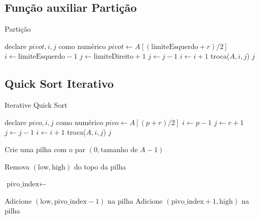 \subsection{Função auxiliar Partição}

\begin{algorithm}
	\caption{Partição}
	\label{algo:particao}
	\begin{algorithmic}[1]
		\State declare $pivot, i, j$ como numérico
		\State $pivot \gets A[(\text{limiteEsquerdo} + r) / 2]$
		\State $i \gets \text{limiteEsquerdo}- 1$
		\State $j \gets \text{limiteDireito} + 1$
		\Repeat
		\State $j \gets j - 1$
		\Repeat
		\State $i \gets i + 1$
		\State troca($A, i, j$)
		\EndIf
		\EndWhile
		\State \Return $j$
		\EndFunction
		\Statex
	\end{algorithmic}
\end{algorithm}

\subsection{Quick Sort Iterativo}

\begin{algorithm}
	\caption{Iterative Quick Sort}
	\label{algo:iterative_quick_sort}
	\begin{algorithmic}[1]
		\Statex

		\State declare $pivo, i, j$ como numérico
		\State $pivo \gets A[(p + r) / 2]$
		\State $i \gets p - 1$
		\State $j \gets r + 1$
		\Repeat
		\State $j \gets j - 1$
		\Repeat
		\State $i \gets i + 1$
		\State troca($A, i, j$)
		\EndIf
		\EndWhile
		\State \Return $j$
		\EndFunction
		\Statex

		\State \Return
		\EndIf
		\State Crie uma pilha com o par $(0, \text{tamanho de } A - 1)$

		\State Remova $(\text{low}, \text{high})$ do topo da pilha

		\State $\text{pivo\_index} \gets$ 

		\State Adicione $(\text{low}, \text{pivo\_index} - 1)$ na pilha 
		\EndIf
		\State Adicione $(\text{pivo\_index} + 1, \text{high})$ na pilha 
		\EndIf
		\EndWhile
		\EndFunction
	\end{algorithmic}
\end{algorithm}
\FloatBarrier

